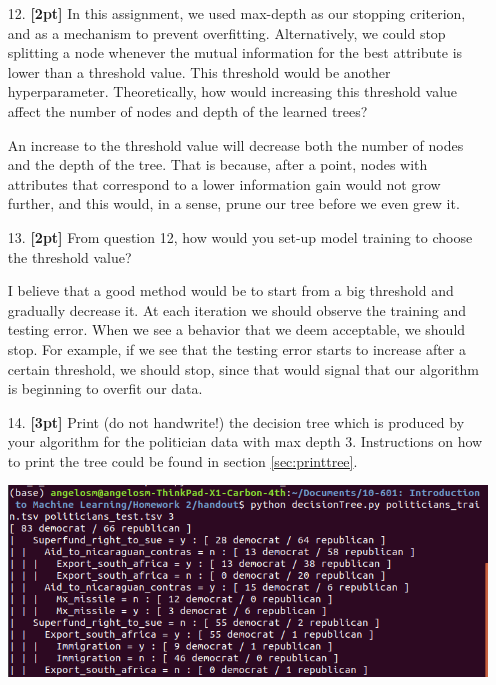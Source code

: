 \documentclass[11pt]{article}
\numberwithin{equation}{section} %
\numberwithin{figure}{section} %
\numberwithin{table}{section} %
\begin{document}
\begin{enumerate}
    \item[12.] \textbf{[2pt]} In this assignment, we used max-depth as our stopping criterion, and as a mechanism to prevent overfitting. Alternatively, we could stop splitting a node whenever the mutual information for the best attribute is lower than a threshold value. This threshold would be another hyperparameter. Theoretically, how would increasing this threshold value affect the number of nodes and depth of the learned trees?
    
    \begin{solution}
    An increase to the threshold value will decrease both the number of nodes and the depth of the tree. That is because, after a point, nodes with attributes that correspond to a lower information gain would not grow further, and this would, in a sense, prune our tree before we even grew it.
    \end{solution}
    

\clearpage
    \item[13.] \textbf{[2pt]} From question 12, how would you set-up model training to choose the threshold value?
    
    \begin{solution}
	I believe that a good method would be to start from a big threshold and gradually decrease it. At each iteration we should observe the training and testing error. When we see a behavior that we deem acceptable, we should stop. For example, if we see that the testing error starts to increase after a certain threshold, we should stop, since that would signal that our algorithm is beginning to overfit our data.
    \end{solution}
    
    
\clearpage
    \item[14.] \textbf{[3pt]} Print (do not handwrite!) the decision tree which is produced by your algorithm for the politician data with max depth 3. Instructions on how to print the tree could be found in section \ref{sec:printtree}.
    
     \begin{solution}
     \includegraphics[scale=0.5]{politicians}
    \end{solution}




\end{enumerate}
\end{document}
